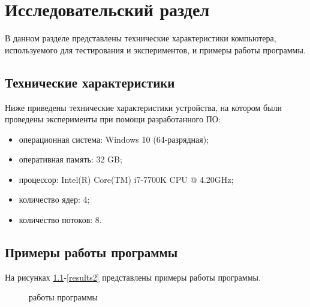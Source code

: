 \chapter{Исследовательский раздел}
В данном разделе представлены технические характеристики компьютера, используемого для тестирования и экспериментов, и примеры работы программы.
 \section{Технические характеристики}

Ниже приведены технические характеристики устройства, на котором были проведены эксперименты при помощи разработанного ПО:

\begin{itemize}
	\item операционная система: Windows 10 (64-разрядная);
	\item оперативная память: 32 GB;
	\item процессор: Intel(R) Core(TM) i7-7700K CPU @ 4.20GHz;
	\item количество ядер: 4;
	\item количество потоков: 8.
\end{itemize}

\section{Примеры работы программы}
На рисунках \ref{results1}-\ref{results2} представлены примеры работы программы.

\begin{figure}[h]
	\caption{работы программы}
	\label{results1}
\end{figure}

